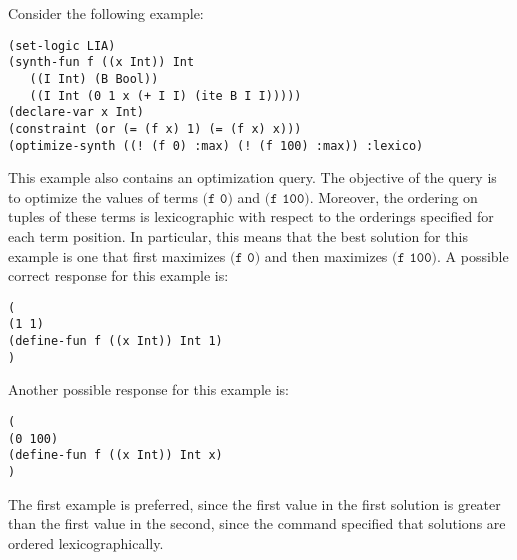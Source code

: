 \documentclass[english,a4paper,10pt]{article}
\begin{document}
\begin{example}
Consider the following example:
\begin{lstlisting}[language=SyGuS]
(set-logic LIA)
(synth-fun f ((x Int)) Int
   ((I Int) (B Bool))
   ((I Int (0 1 x (+ I I) (ite B I I)))))
(declare-var x Int)
(constraint (or (= (f x) 1) (= (f x) x)))
(optimize-synth ((! (f 0) :max) (! (f 100) :max)) :lexico)
\end{lstlisting}
This example also contains an optimization query.
The objective of the query is to optimize the values
of terms $\texttt{(f 0)}$ and $\texttt{(f 100)}$.
Moreover, the ordering on tuples of these terms is lexicographic
with respect to the orderings specified for each term position.
In particular, this means that the best solution for this
example is one that first maximizes $\texttt{(f 0)}$ and then
maximizes $\texttt{(f 100)}$.
A possible correct response for this example is:
\begin{lstlisting}[language=SyGuS]
(
(1 1)
(define-fun f ((x Int)) Int 1)
)
\end{lstlisting}
Another possible response for this example is:
\begin{lstlisting}[language=SyGuS]
(
(0 100)
(define-fun f ((x Int)) Int x)
)
\end{lstlisting}
The first example is preferred, since the first value in the first
solution is greater than the first value in the second,
since the command specified that solutions are ordered lexicographically.
\end{example}
\end{document}

